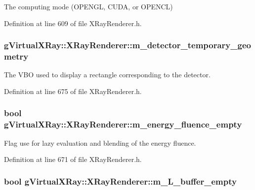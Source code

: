 The computing mode (OPENGL, CUDA, or OPENCL) 



Definition at line 609 of file XRayRenderer.h.

\hypertarget{classg_virtual_x_ray_1_1_x_ray_renderer_ad17a5ac822d9095a14d361a41dd2827c}{
\subsubsection[{m\_\-detector\_\-temporary\_\-geometry}]{ {\bf gVirtualXRay::XRayRenderer::m\_\-detector\_\-temporary\_\-geometry}}}
\label{classg_virtual_x_ray_1_1_x_ray_renderer_ad17a5ac822d9095a14d361a41dd2827c}


The VBO used to display a rectangle corresponding to the detector. 



Definition at line 675 of file XRayRenderer.h.

\hypertarget{classg_virtual_x_ray_1_1_x_ray_renderer_aab1918fd34945b6afc1d1105e946001e}{
\subsubsection[{m\_\-energy\_\-fluence\_\-empty}]{\setlength{\rightskip}{0pt plus 5cm}bool {\bf gVirtualXRay::XRayRenderer::m\_\-energy\_\-fluence\_\-empty}}}
\label{classg_virtual_x_ray_1_1_x_ray_renderer_aab1918fd34945b6afc1d1105e946001e}


Flag use for lazy evaluation and blending of the energy fluence. 



Definition at line 671 of file XRayRenderer.h.

\hypertarget{classg_virtual_x_ray_1_1_x_ray_renderer_aca5aa1801c0c56d9c2129d53a81aa2d1}{
\subsubsection[{m\_\-L\_\-buffer\_\-empty}]{\setlength{\rightskip}{0pt plus 5cm}bool {\bf gVirtualXRay::XRayRenderer::m\_\-L\_\-buffer\_\-empty}}}
\label{classg_virtual_x_ray_1_1_x_ray_renderer_aca5aa1801c0c56d9c2129d53a81aa2d1}


